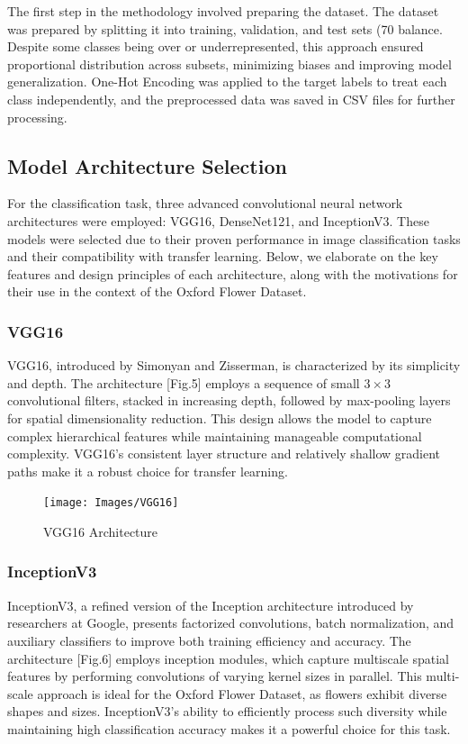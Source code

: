 The first step in the methodology involved preparing the dataset. The dataset was prepared by splitting it into
training, validation, and test sets (70%
balance. Despite some classes being over or underrepresented, this approach ensured proportional distribution across
subsets, minimizing biases and improving model generalization. One-Hot Encoding was applied to the target labels to
treat each class independently, and the preprocessed data was saved in CSV files for further processing.

\subsection{Model Architecture Selection}

For the classification task, three advanced convolutional neural network architectures were employed: VGG16,
DenseNet121, and InceptionV3. These models were selected due to their proven performance in image
classification tasks and their compatibility with transfer learning. Below, we elaborate on the key features and design
principles of each architecture, along with the motivations for their use in the context of the Oxford Flower Dataset.

\subsubsection*{VGG16}
VGG16, introduced by Simonyan and Zisserman, is characterized by its simplicity and depth. The architecture [Fig.5] employs a
sequence of small $3 \times 3$ convolutional filters, stacked in increasing depth, followed by max-pooling layers for
spatial dimensionality reduction. This design allows the model to capture complex hierarchical features while
maintaining manageable computational complexity. VGG16's consistent layer structure and relatively shallow gradient
paths make it a robust choice for transfer learning.

\begin{figure}[h!]
    \centering
    \texttt{[image: Images/VGG16]}
    \caption{VGG16 Architecture}
\end{figure}

\subsubsection*{InceptionV3}
InceptionV3, a refined version of the Inception architecture introduced by researchers at Google, presents factorized
convolutions, batch normalization, and auxiliary classifiers to improve both training efficiency and accuracy.
The architecture [Fig.6] employs inception modules, which capture multiscale spatial features by performing convolutions of
varying kernel sizes in parallel. This multi-scale approach is ideal for the Oxford Flower Dataset, as flowers exhibit
diverse shapes and sizes. InceptionV3's ability to efficiently process such diversity while maintaining high
classification accuracy makes it a powerful choice for this task.

